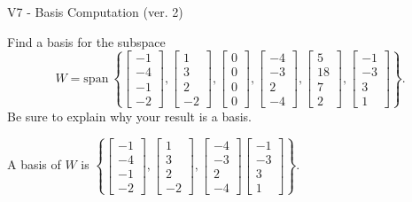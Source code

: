 \begin{exercise}
  \begin{exerciseTitle}V7 - Basis Computation (ver. 2)\end{exerciseTitle}
  \begin{exerciseStatement}
    Find a basis for the subspace 
\[W=\mathrm{span}\ \left\{\left[\begin{array}{r}
-1 \\
-4 \\
-1 \\
-2
\end{array}\right] , \left[\begin{array}{r}
1 \\
3 \\
2 \\
-2
\end{array}\right] , \left[\begin{array}{r}
0 \\
0 \\
0 \\
0
\end{array}\right] , \left[\begin{array}{r}
-4 \\
-3 \\
2 \\
-4
\end{array}\right] , \left[\begin{array}{r}
5 \\
18 \\
7 \\
2
\end{array}\right] , \left[\begin{array}{r}
-1 \\
-3 \\
3 \\
1
\end{array}\right]\right\}.\]
 Be sure to explain why your result is a basis.


  \end{exerciseStatement}
  \begin{exerciseAnswer}
   A basis of \(W\) is  \(\left\{\left[\begin{array}{r}
-1 \\
-4 \\
-1 \\
-2
\end{array}\right] , \left[\begin{array}{r}
1 \\
3 \\
2 \\
-2
\end{array}\right] , \left[\begin{array}{r}
-4 \\
-3 \\
2 \\
-4
\end{array}\right] \left[\begin{array}{r}
-1 \\
-3 \\
3 \\
1
\end{array}\right]\right\}\).
  


  \end{exerciseAnswer}
\end{exercise}